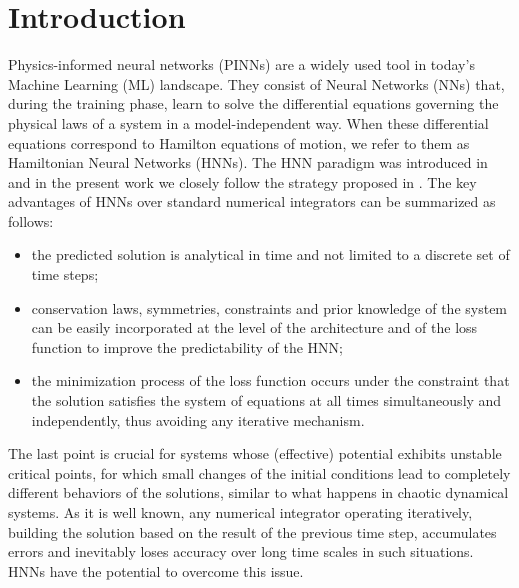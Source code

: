 \documentclass[prd,aps,a4paper,eqsecnum,nofootinbib,floatfix,twocolumn,superscriptaddress]{revtex4-2}
\begin{document}
\maketitle

\section{\label{sec:introduction} Introduction}

Physics-informed neural networks (PINNs) are a widely used tool in today's Machine Learning (ML) landscape. They consist of Neural Networks (NNs) that, during the training phase, learn to solve the differential equations governing the physical laws of a system in a model-independent way. When these differential equations correspond to Hamilton equations of motion, we refer to them as Hamiltonian Neural Networks (HNNs). The HNN paradigm was introduced in \cite{HNN} and in the present work we closely follow the strategy proposed in \cite{Harvard}. The key advantages of HNNs over standard numerical integrators can be summarized as follows:

\begin{itemize}
	\item the predicted solution is analytical in time and not limited to a discrete set of time steps;
	\item conservation laws, symmetries, constraints and prior knowledge of the system can be easily incorporated at the level of the architecture and of the loss function to improve the predictability of the HNN;
	\item the minimization process of the loss function occurs under the constraint that the solution satisfies the system of equations at all times simultaneously and independently, thus avoiding any iterative mechanism.
\end{itemize}

The last point is crucial for systems whose (effective) potential exhibits unstable critical points, for which small changes of the initial conditions lead to completely different behaviors of the solutions, similar to what happens in chaotic dynamical systems. As it is well known, any numerical integrator operating iteratively, building the solution based on the result of the previous time step, accumulates errors and inevitably loses accuracy over long time scales in such situations. HNNs have the potential to overcome this issue.
\end{document}
